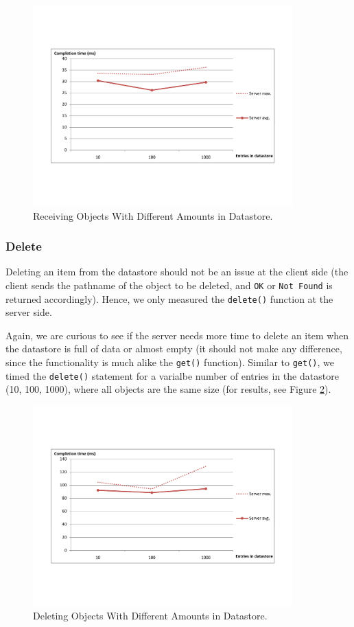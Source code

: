 \begin{figure} %
\begin{center}
\includegraphics[trim=5cm 4cm 5cm 5cm,width=10cm]{./figures/get_amt.pdf}
\caption{Receiving Objects With Different Amounts in Datastore.
\label{get-obj-amt}}
\end{center}
\end{figure}

\subsubsection{Delete}
Deleting an item from the datastore should not be an issue at the client side
(the client sends the pathname of the object to be deleted, and \texttt{OK} or
\texttt{Not Found} is returned accordingly). Hence, we only measured the
\texttt{delete()} function at the server side. 

Again, we are curious to see if the server needs more time to delete an item
when the datastore is full of data or almost empty (it should not make any
difference, since the functionality is much alike the \texttt{get()} function).
Similar to \texttt{get()}, we timed the \texttt{delete()} statement for a
varialbe number of entries in the datastore (10, 100, 1000), where all objects
are the same size (for results, see Figure \ref{del-obj-amt}).

\begin{figure} %
\begin{center}
\includegraphics[trim=5cm 4cm 5cm 5cm,width=10cm]{./figures/del_amt.pdf}
\caption{Deleting Objects With Different Amounts in Datastore.
\label{del-obj-amt}}
\end{center}
\end{figure}

